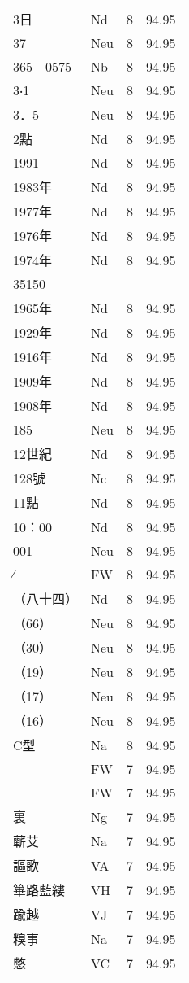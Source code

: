 \documentclass[twocolumn]{book}
\begin{document}
\begin{supertabular}{llrr}
3日 & Nd & 8 &  94.95\\
37 & Neu & 8 &  94.95\\
365—0575 & Nb & 8 &  94.95\\
3‧1 & Neu & 8 &  94.95\\
3．5 & Neu & 8 &  94.95\\
2點 & Nd & 8 &  94.95\\
1991 & Nd & 8 &  94.95\\
1983年 & Nd & 8 &  94.95\\
1977年 & Nd & 8 &  94.95\\
1976年 & Nd & 8 &  94.95\\
1974年 & Nd & 8 &  94.95\\
35150\\
1965年 & Nd & 8 &  94.95\\
1929年 & Nd & 8 &  94.95\\
1916年 & Nd & 8 &  94.95\\
1909年 & Nd & 8 &  94.95\\
1908年 & Nd & 8 &  94.95\\
185 & Neu & 8 &  94.95\\
12世紀 & Nd & 8 &  94.95\\
128號 & Nc & 8 &  94.95\\
11點 & Nd & 8 &  94.95\\
10：00 & Nd & 8 &  94.95\\
001 & Neu & 8 &  94.95\\
∕ & FW & 8 &  94.95\\
（八十四） & Nd & 8 &  94.95\\
（66） & Neu & 8 &  94.95\\
（30） & Neu & 8 &  94.95\\
（19） & Neu & 8 &  94.95\\
（17） & Neu & 8 &  94.95\\
（16） & Neu & 8 &  94.95\\
C型 & Na & 8 &  94.95\\
 & FW & 7 &  94.95\\
 & FW & 7 &  94.95\\
裏 & Ng & 7 &  94.95\\
蘄艾 & Na & 7 &  94.95\\
謳歌 & VA & 7 &  94.95\\
篳路藍縷 & VH & 7 &  94.95\\
踰越 & VJ & 7 &  94.95\\
糗事 & Na & 7 &  94.95\\
憋 & VC & 7 &  94.95\\

\end{supertabular}
\end{document}
